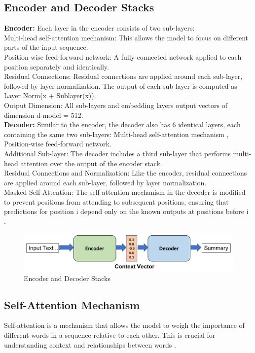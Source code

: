 \subsection{Encoder and Decoder Stacks}
\textbf{Encoder:} Each layer in the encoder consists of two sub-layers: \\
Multi-head self-attention mechanism: This allows the model to focus on different parts of the input sequence. \\
Position-wise feed-forward network: A fully connected network applied to each position separately and identically. \\
Residual Connections: Residual connections are applied around each sub-layer, followed by layer normalization. The output of each sub-layer is computed as Layer Norm(x + Sublayer(x)). \\
Output Dimension: All sub-layers and embedding layers output vectors of dimension d-model = 512.\\
\textbf{Decoder:} Similar to the encoder, the decoder also has 6 identical layers, each containing the same two sub-layers:
Multi-head self-attention mechanism ,
Position-wise feed-forward network. \\
Additional Sub-layer: The decoder includes a third sub-layer that performs multi-head attention over the output of the encoder stack. \\
Residual Connections and Normalization: Like the encoder, residual connections are applied around each sub-layer, followed by layer normalization. \\
Masked Self-Attention: The self-attention mechanism in the decoder is modified to prevent positions from attending to subsequent positions, ensuring that predictions for position i depend only on the known outputs at positions before i \cite{vaswani2017attention}.
\begin{figure}[htbp]
	
	\centerline{\includegraphics[width=.8\linewidth]{
			Figures/incoderDecoder.png}}
	\caption{Encoder and Decoder Stacks}
	\label{incoderDecoder.png}
	
\end{figure}
\subsection{Self-Attention Mechanism}
Self-attention is a mechanism that allows the model to weigh the importance of different words in a sequence relative to each other. This is crucial for understanding context and relationships between words \cite{vaswani2017attention}.
